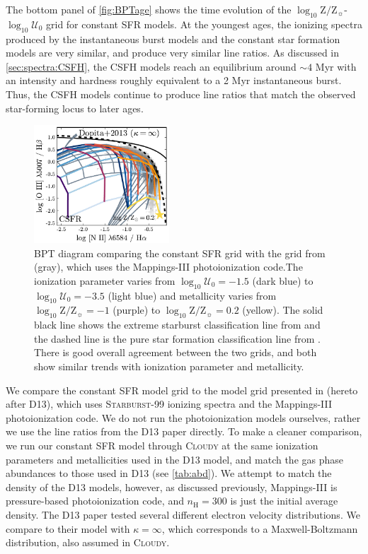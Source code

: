\documentclass[linenumbers, trackchanges, tighten]{aastex61}%
\newcommand{\Fig}[1]{\autoref{fig:#1}}
\newcommand{\Sec}[1]{\autoref{sec:#1}}
\newcommand{\Tab}[1]{\autoref{tab:#1}}
\newcommand{\Mappings}{{\sc Mappings-III}\xspace}
\newcommand{\SB}{\textsc{Starburst-99}\xspace}
\newcommand{\Cloudy}{\textsc{Cloudy}\xspace}
\newcommand{\logten}{\ensuremath{\log_{10}}}
\newcommand{\nH}{\ensuremath{n_{\mathrm{H}}}}
\newcommand{\logz}{\ensuremath{\logten \mathrm{Z}/\mathrm{Z}_{\sun}}}
\newcommand{\logZeq}[1]{\ensuremath{\logten \mathrm{Z}/\mathrm{Z}_{\sun} = #1}}
\newcommand{\logU}{\ensuremath{\logten \mathcal{U}_0}}
\begin{document}
The bottom panel of \Fig{BPTage} shows the time evolution of the \logz{}-\logU{} grid for constant SFR models. At the youngest ages, the ionizing spectra produced by the instantaneous burst models and the constant star formation models are very similar, and produce very similar line ratios. As discussed in \Sec{spectra:CSFH}, the CSFH models reach an equilibrium around $\sim4$ Myr with an intensity and hardness roughly equivalent to a 2 Myr instantaneous burst. Thus, the CSFH models continue to produce line ratios that match the observed star-forming locus to later ages.
\begin{figure}[!htbp]
  \begin{centering}
    \includegraphics[width=0.45\textwidth]{f18.pdf}
    \caption{BPT diagram comparing the constant SFR grid with the grid from \citet{Dopita13} (gray), which uses the \Mappings photoionization code.The ionization parameter varies from $\logU=-1.5$ (dark blue) to $\logU=-3.5$ (light blue) and metallicity varies from \logZeq{-1} (purple) to \logZeq{0.2} (yellow). The solid black line shows the extreme starburst classification line from \citet{Kewley01} and the dashed line is the pure star formation classification line from \citet{Kauffmann03a}. There is good overall agreement between the two grids, and both show similar trends with ionization parameter and metallicity.}
    \label{fig:CSFHdop}
  \end{centering}
\end{figure}

We compare the constant SFR model grid to the model grid presented in \citet{Dopita13} (hereto after D13), which uses \SB{} ionizing spectra and the \Mappings photoionization code. We do not run the photoionization models ourselves, rather we use the line ratios from the D13 paper directly. To make a cleaner comparison, we run our constant SFR model through \Cloudy at the same ionization parameters and metallicities used in the D13 model, and match the gas phase abundances to those used in D13 (see \Tab{abd}). We attempt to match the density of the D13 models, however, as discussed previously, \Mappings is pressure-based photoionization code, and $\nH=300$ is just the initial average density. The D13 paper tested several different electron velocity distributions. We compare to their model with $\kappa=\infty$, which corresponds to a Maxwell-Boltzmann distribution, also assumed in \Cloudy.
\end{document}
